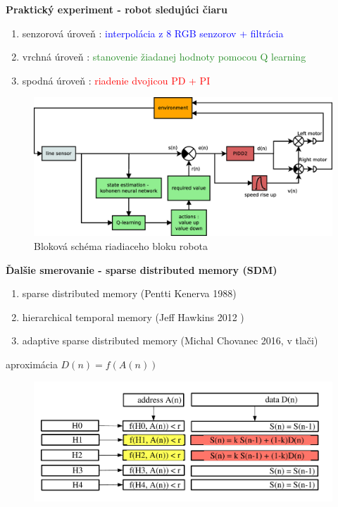\documentclass[xcolor=dvipsnames]{beamer}
\begin{document}
\begin{frame}{\bf Praktický experiment - robot sledujúci čiaru}

\begin{enumerate}
 \item senzorová úroveň : \textcolor{blue}{interpolácia z 8 RGB senzorov + filtrácia}
 \item vrchná úroveň : \textcolor{ForestGreen}{stanovenie žiadanej hodnoty pomocou Q learning}
 \item spodná úroveň : \textcolor{red}{riadenie dvojicou PD + PI}
\end{enumerate}

\begin{figure}[!htb]
\centering
\includegraphics[scale=.2]{../diagrams/motoko_robot_block.eps}
\caption{Bloková schéma riadiaceho bloku robota}
\label{img:motoko_robot_block}
\end{figure}


\end{frame}

\begin{frame}{\bf Ďalšie smerovanie - sparse distributed memory (SDM)}
\begin{enumerate}
 \item sparse distributed memory {(\footnotesize Pentti Kenerva 1988)}
 \item  hierarchical temporal memory {(\footnotesize Jeff Hawkins 2012 )}
 \item adaptive sparse distributed memory {(\footnotesize Michal Chovanec 2016, v tlači)}
\end{enumerate}
\bigskip
aproximácia
$D(n) = f( A(n) )$
\begin{figure}[!htb]
\centering
\includegraphics[scale=.4]{../pictures/sdm.pdf}
\label{img:motoko_robot_block}
\end{figure}
\end{frame}
\end{document}

